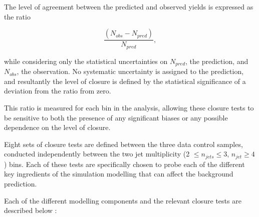 The level of agreement between the predicted and observed yields is expressed as the ratio 

\begin{equation}
\label{eq:closuretests}
\frac{(N_{obs}-N_{pred})}{N_{pred}},
\end{equation}

while considering only the statistical uncertainties on $N_{pred}$, the prediction, and $N_{obs}$, the observation. No systematic uncertainty is assigned to the prediction, and resultantly the level of closure is defined by the statistical significance of a deviation from the ratio from zero.

This ratio is measured for each \theht bin in the analysis, allowing these closure tests to be sensitive to both the presence of any significant biases or any possible \theht dependence on the level of closure.

Eight sets of closure tests are defined between the three data control samples, conducted independently between the two jet multiplicity (2 $\leq n_{jets} \leq 3$, $n_{jet} \geq 4$ ) bins. Each of these tests are specifically chosen to probe each of the different key ingredients of the simulation modelling that can affect the background prediction.

Each of the different modelling components and the relevant closure tests are described below :

